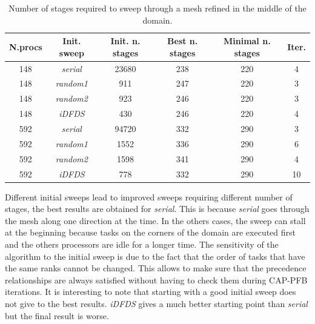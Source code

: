 \documentclass[letterpaper]{article}
\renewcommand{\(}{\left(}
\renewcommand{\)}{\right)}
\renewcommand{\[}{\left[}
\renewcommand{\]}{\right]}
\begin{document}
\begin{table}[H]
  \begin{center}
    \begin{tabular}{|c|c|c|c|c|c|}
      \hline
      N.procs & Init. sweep & Init. n. stages & Best n. stages & Minimal n. stages & Iter. \\
      \hline
      148 &  \emph{serial} & 23680 & 238 & 220 &  4 \\
      148 & \emph{random1} &   911 & 247 & 220 &  3 \\
      148 & \emph{random2} &   923 & 246 & 220 &  3 \\
      148 &   \emph{iDFDS} &   430 & 246 & 220 &  4 \\
      592 &  \emph{serial} & 94720 & 332 & 290 &  3 \\
      592 & \emph{random1} &  1552 & 336 & 290 &  6 \\
      592 & \emph{random2} &  1598 & 341 & 290 &  4 \\
      592 &   \emph{iDFDS} &   778 & 332 & 290 & 10 \\
      \hline
    \end{tabular}
    \caption{Number of stages required to sweep through a mesh refined
    in the middle of the domain.}
    \label{amr_1}
  \end{center}
\end{table}
Different initial sweeps lead to improved sweeps requiring different number of
stages, the best results are obtained for \emph{serial}. This is because
\emph{serial} goes through the mesh along one direction at the time. In the
others cases, the sweep can stall at the beginning because tasks on the corners
of the domain are executed first and the others processors are idle for a longer
time. The sensitivity of the algorithm to the initial sweep is due to the fact
that the order of tasks that have the same ranks cannot be changed. This allows
to make sure that the precedence relationships are always satisfied without
having to check them during CAP-PFB iterations. It is interesting to note that
starting with a good initial sweep does not give to the best results.
\emph{iDFDS} gives a much better starting point than \emph{serial} but the final
result is worse.
\end{document}

